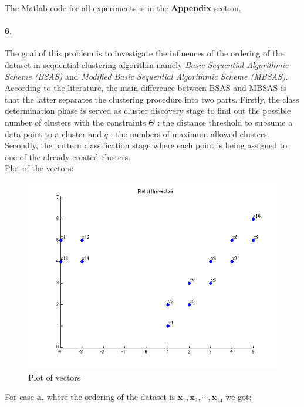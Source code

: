 \documentclass[a4paper]{article}
\begin{document}
\setcounter{page}{6}

\noindent The Matlab code for all experiments is in the \textbf{Appendix} section.

\paragraph{6.} The goal of this problem is to investigate the influences of the ordering of the dataset in sequential clustering algorithm namely \emph{Basic Sequential Algorithmic Scheme (BSAS)} and \emph{Modified Basic Sequential Algorithmic Scheme (MBSAS)}. According to the literature, the main difference between BSAS and MBSAS is that the latter separates the clustering procedure into two parts. Firstly, the class determination phase is served as cluster discovery stage to find out the possible number of clusters with the constraints $\Theta$ : the distance threshold to subsume a data point to a cluster and $q$ : the numbers of maximum allowed clusters. Secondly, the pattern classification stage where each point is being assigned to one of the already created clusters. \\

	\underline{Plot of the vectors:}
	
	\begin{figure}[H]
	  \centering
	    \includegraphics[scale=.57]{images/vectors.png}
	  \caption{Plot of vectors}
	\end{figure}

	For case \textbf{a.} where the ordering of the dataset is $\mathbf{x}_1, \mathbf{x}_2,\cdots, \mathbf{x}_{14}$ we got:
	
\end{document}

